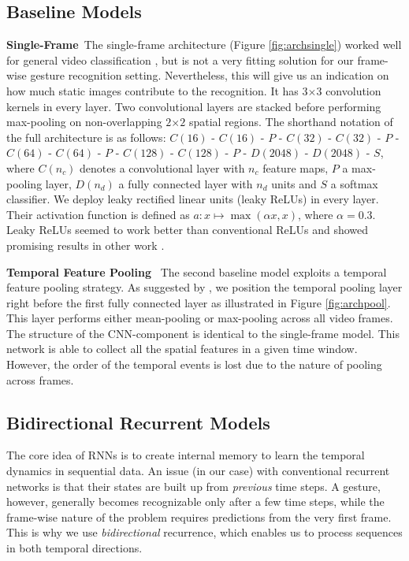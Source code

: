 \documentclass[11pt,a4paper]{article} \usepackage{a4wide}
\begin{document}
\subsection{Baseline Models}



\textbf{Single-Frame}\, The single-frame architecture (Figure \ref{fig:archsingle}) worked well for general video classification \citep{karpathy2014large}, but is not a very fitting solution for our frame-wise gesture recognition setting. Nevertheless, this will give us an indication on how much static images contribute to the recognition. It has $3$$\times$$3$ convolution kernels in every layer. Two convolutional layers are stacked before performing max-pooling on non-overlapping $2$$\times$$2$ spatial regions. The shorthand notation of the full architecture is as follows: $C(16)$ - $C(16)$ - $P$ - $C(32)$ - $C(32)$ - $P$ - $C(64)$ - $C(64)$ - $P$ - $C(128)$ - $C(128)$ - $P$ - $D(2048)$ - $D(2048)$ - $S$, where $C(n_c)$ denotes a convolutional layer with $n_c$ feature maps, $P$ a max-pooling layer, $D(n_d)$ a fully connected layer with $n_d$ units and $S$ a softmax classifier. We deploy leaky rectified linear units (leaky ReLUs) in every layer. Their activation function is defined as $ a: x \mapsto \max(\alpha x, x)$, where $\alpha=0.3$. Leaky ReLUs seemed to work better than conventional ReLUs and showed promising results in other work \citep{maas2013rectifier,graham2014spatially,ndsb,xu2015empirical}. 




\textbf{Temporal Feature Pooling} \, The second baseline model exploits a temporal feature pooling strategy. As suggested by \cite{ng2015beyond}, we position the temporal pooling layer right before the first fully connected layer as illustrated in Figure \ref{fig:archpool}. This layer performs either mean-pooling or max-pooling across all video frames. The structure of the CNN-component is identical to the single-frame model. This network is able to collect all the spatial features in a given time window. However, the order of the temporal events is lost due to the nature of pooling across frames.





\subsection{Bidirectional Recurrent Models} \label{sec:rnn}


The core idea of RNNs is to create internal memory to learn the temporal dynamics in sequential data. 
An issue (in our case) with conventional recurrent networks is that their states are built up from \emph{previous} time steps. A gesture, however, generally becomes recognizable only after a few time steps, while the frame-wise nature of the problem requires predictions from the very first frame. This is why we use \emph{bidirectional} recurrence, which enables us to process sequences in both temporal directions. 
\end{document}
